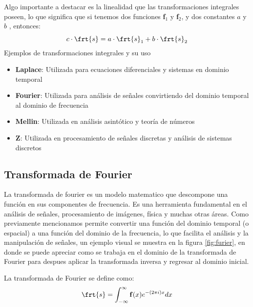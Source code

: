 \documentclass[12pt]{article}
\begin{document}
Algo importante a destacar es la linealidad que las transformaciones integrales poseen, lo que significa que si tenemos dos funciones \textbf{f}$_1$ y \textbf{f}$_2$, y dos constantes $a$ y $b$\cite{sciencedirect-integral, britannica-integral}
, entonces:
\begin{equation}
c\cdot \frt{s} = a \cdot \frt{s}_1 + b \cdot \frt{s}_2
\label{eq:cl}
\end{equation}
Ejemplos de transformaciones integrales y su uso
\begin{itemize}
    \item \textbf{Laplace}: Utilizada para ecuaciones diferenciales y sistemas en dominio temporal
    \item \textbf{Fourier}: Utilizada para análisis de señales convirtiendo del dominio temporal al dominio de frecuencia
    \item \textbf{Mellin}: Utilizada en análisis asintótico y teoría de números
    \item \textbf{Z}: Utilizada en procesamiento de señales discretas y análisis de sistemas discretos
\end{itemize}

\subsection{Transformada de Fourier}
La transformada de fourier es un modelo matematico que descompone una función en sus componentes de frecuencia. Es una herramienta fundamental en el análisis de señales, procesamiento de imágenes, física y muchas otras áreas. Como previamente mencionamos permite convertir una función del dominio temporal (o espacial) a una función del dominio de la frecuencia, lo que facilita el análisis y la manipulación de señales, un ejemplo visual se muestra en la figura \ref{fig:furier}, en donde se puede apreciar como se trabaja en el dominio de la transformada de Fourier para despues aplicar la transformada inversa y regresar al dominio inicial.

La transformada de Fourier se define como:
\begin{equation}
\frt{s} = \int_{-\infty}^{\infty} \mathbf{f}(x) e^{-(2\pi i) x} dx
\label{eq:furierrial}
\end{equation}
\end{document}
